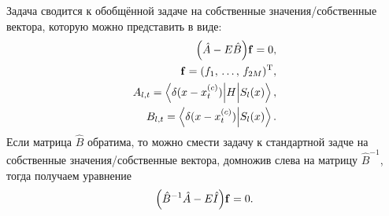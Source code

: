 \documentclass[10pt]{article}
\begin{document}
Задача сводится к обобщённой задаче на собственные значения/собственные вектора, которую можно представить в виде:
\begin{equation}
 \begin{split}
  \qty(\hat A - E \hat B) \vb{f} = 0,\\
  \vb{f} = (f_1,\, \ldots,\, f_{2M})^\textrm{T},\\
  A_{l,t} = \mel**{\delta(x-x^{(c)}_t)}{H}{S_{l}(x)},\\
  B_{l,t} = \braket{\delta(x-x^{(c)}_t)}{S_{l}(x)}.
 \end{split}
\end{equation}
Если матрица $\hat B$ обратима, то можно смести задачу к стандартной задче на собственные значения/собственные вектора, домножив слева на матрицу  $\hat B^{-1}$, тогда получаем уравнение
\begin{equation}
 \qty(\hat B^{-1} \hat A - E \hat I) \vb{f} = 0.
\end{equation}
\end{document}
